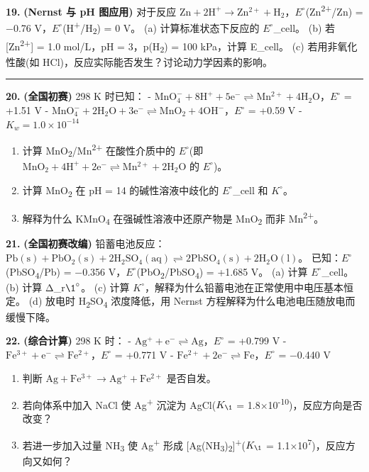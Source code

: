 \documentclass[a4paper,11pt]{ctexart}
\providecommand{\tightlist}{\setlength{\itemsep}{0pt}\setlength{\parskip}{0pt}}
\newcommand{\箭}{\ensuremath{\rightarrow}}
\newcommand{\左箭}{\ensuremath{\leftarrow}}
\newcommand{\上箭}{\ensuremath{\uparrow}}
\newcommand{\下箭}{\ensuremath{\downarrow}}
\newcommand{\衡}{\ensuremath{\rightleftharpoons}}
\newcommand{\双箭}{\ensuremath{\leftrightarrow}}
\newcommand{\约等于}{\ensuremath{\approx}}
\newcommand{\小于等于}{\ensuremath{\leq}}
\newcommand{\大于等于}{\ensuremath{\geq}}
\newcommand{\不等于}{\ensuremath{\neq}}
\newcommand{\西格马}{\ensuremath{\sigma}}
\newcommand{\派}{\ensuremath{\pi}}
\begin{document}
\textbf{19.} \textbf{(Nernst 与 pH 图应用)} 对于反应 \(\mathrm{Zn + 2H^+ \to Zn^{2+} + H_2}\)，\(E^{\circ}\)(Zn\textsuperscript{2+}/Zn) = −0.76 V，\(E^{\circ}\)(H\textsuperscript{+}/H\textsubscript{2}) = 0 V。
(a) 计算标准状态下反应的 \(E^{\circ}\)\_cell。
(b) 若 {[}Zn\textsuperscript{2+}{]} = 1.0 mol/L，pH = 3，p(H\textsubscript{2}) = 100 kPa，计算 E\_cell。
(c) 若用非氧化性酸(如 HCl)，反应实际能否发生？讨论动力学因素的影响。

\begin{center}\rule{0.5\linewidth}{0.5pt}\end{center}

\textbf{20.} \textbf{(全国初赛)} 298 K 时已知：
- \(\mathrm{MnO_4^- + 8H^+ + 5e^- \rightleftharpoons Mn^{2+} + 4H_2O}\)，\(E^{\circ}\) = +1.51 V
- \(\mathrm{MnO_4^- + 2H_2O + 3e^- \rightleftharpoons MnO_2 + 4OH^-}\)，\(E^{\circ}\) = +0.59 V
- \(K_w = 1.0 \times 10^{-14}\)

\begin{enumerate}
\def\labelenumi{(\alph{enumi})}
\tightlist
\item
  计算 MnO\textsubscript{2}/Mn\textsuperscript{2+} 在酸性介质中的 \(E^{\circ}\)(即 \(\mathrm{MnO_2 + 4H^+ + 2e^- \rightleftharpoons Mn^{2+} + 2H_2O}\) 的 \(E^{\circ}\))。
\item
  计算 MnO\textsubscript{2} 在 pH = 14 的碱性溶液中歧化的 \(E^{\circ}\)\_cell 和 \(K^{\circ}\)。
\item
  解释为什么 KMnO\textsubscript{4} 在强碱性溶液中还原产物是 MnO\textsubscript{2} 而非 Mn\textsuperscript{2+}。
\end{enumerate}

\textbf{21.} \textbf{(全国初赛改编)} 铅蓄电池反应：\(\mathrm{Pb(s) + PbO_2(s) + 2H_2SO_4(aq) \rightleftharpoons 2PbSO_4(s) + 2H_2O(l)}\)。
已知：\(E^{\circ}\)(PbSO\textsubscript{4}/Pb) = −0.356 V，\(E^{\circ}\)(PbO\textsubscript{2}/PbSO\textsubscript{4}) = +1.685 V。
(a) 计算 \(E^{\circ}\)\_cell。
(b) 计算 Δ\_r\(\1^{\circ}\)。
(c) 计算 \(K^{\circ}\)，解释为什么铅蓄电池在正常使用中电压基本恒定。
(d) 放电时 H\textsubscript{2}SO\textsubscript{4} 浓度降低，用 Nernst 方程解释为什么电池电压随放电而缓慢下降。

\textbf{22.} \textbf{(综合计算)} 298 K 时：
- \(\mathrm{Ag^+ + e^- \rightleftharpoons Ag}\)，\(E^{\circ}\) = +0.799 V
- \(\mathrm{Fe^{3+} + e^- \rightleftharpoons Fe^{2+}}\)，\(E^{\circ}\) = +0.771 V
- \(\mathrm{Fe^{2+} + 2e^- \rightleftharpoons Fe}\)，\(E^{\circ}\) = −0.440 V

\begin{enumerate}
\def\labelenumi{(\alph{enumi})}
\tightlist
\item
  判断 \(\mathrm{Ag + Fe^{3+} \to Ag^+ + Fe^{2+}}\) 是否自发。
\item
  若向体系中加入 NaCl 使 Ag\textsuperscript{+} 沉淀为 AgCl(\(K_{\1}\) = 1.8×10\textsuperscript{-10})，反应方向是否改变？
\item
  若进一步加入过量 NH\textsubscript{3} 使 Ag\textsuperscript{+} 形成 {[}Ag(NH\textsubscript{3})\textsubscript{2}{]}\textsuperscript{+}(\(K_{\1}\) = 1.1×10\textsuperscript{7})，反应方向又如何？
\end{enumerate}
\end{document}
